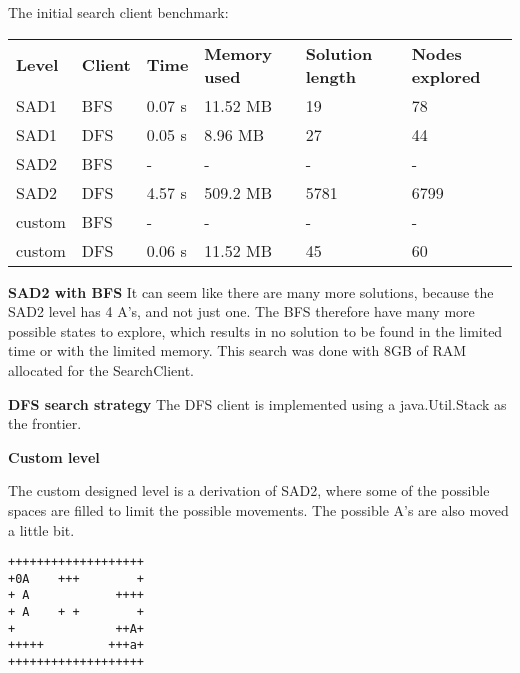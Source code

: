\documentclass[Main]{subfiles}
\begin{document}
The initial search client benchmark:

\begin{table}[h]
\begin{tabular}{llllll}
\rowcolor[HTML]{EFEFEF} 
\textbf{Level} & \textbf{Client} & \textbf{Time} & \textbf{Memory used} & \textbf{Solution length} & \textbf{Nodes explored} \\
SAD1           & BFS             & 0.07 s        & 11.52 MB             & 19                       & 78                      \\
SAD1           & DFS             & 0.05 s        & 8.96 MB              & 27                       & 44                      \\
SAD2           & BFS             & -           & -                  & -                      & -                     \\
SAD2           & DFS             & 4.57 s        & 509.2 MB             & 5781                     & 6799                    \\
custom         & BFS             & -           & -                  & -                      & -                     \\
custom         & DFS             & 0.06 s        & 11.52 MB             & 45                       & 60                     
\end{tabular}
\end{table}


\textbf{SAD2 with BFS} 
It can seem like there are many more solutions, because the SAD2 level has 4 A's, and not just one. The BFS therefore have many more possible states to explore, which results in no solution to be found in the limited time or with the limited memory. This search was done with 8GB of RAM allocated for the SearchClient.



\textbf{DFS search strategy}
The DFS client is implemented using a java.Util.Stack as the frontier. 


\textbf{Custom level}

The custom designed level is a derivation of SAD2, where some of the possible spaces are filled to limit the possible movements. The possible A's are also moved a little bit. 

\begin{verbatim}
+++++++++++++++++++
+0A    +++        +
+ A            ++++
+ A    + +        +
+              ++A+
+++++         +++a+
+++++++++++++++++++
\end{verbatim}
\end{document}

